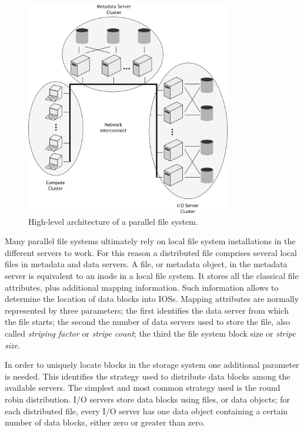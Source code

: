 \begin{figure}[!htb]
\centering
\includegraphics[width=0.8\textwidth]{figures/pfs}
\caption{High-level architecture of a parallel file system.}
\label{figure: pfs}
\end{figure}

Many parallel file systems ultimately rely on local file system installations in the different servers to work. For this reason a distributed file comprises several local files in metadata and data servers. A file, or 
metadata object, in the metadata server is equivalent to an inode in a local file system. It stores all the classical file attributes, plus additional mapping information. Such information allows to determine the location 
of data blocks into IOSs. Mapping attributes are normally represented by three parameters; the first identifies the data server from which the file starts; the second the number of data servers used to store the file, 
also called \textit{striping factor} or \textit{stripe count}; the third the file system block size or \textit{stripe size}. 

In order to uniquely locate blocks in the storage system one additional parameter is needed. This identifies the strategy used to distribute data blocks among the available servers. The simplest and most common strategy 
used is the round robin distribution. I/O servers store data blocks using files, or data objects; for each distributed file, every I/O server has one data object containing a certain number of data blocks, either zero or 
greater than zero.

